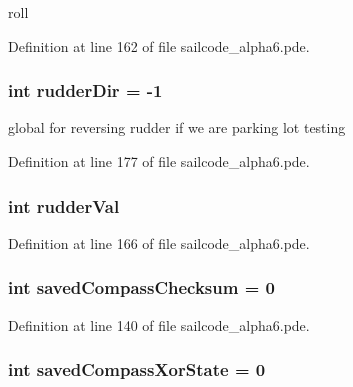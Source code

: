 roll 



\-Definition at line 162 of file sailcode\-\_\-alpha6.\-pde.

\hypertarget{group__group1_gaf79de3204853b3b4101113683e74cd54}{
\subsubsection[{rudder\-Dir}]{\setlength{\rightskip}{0pt plus 5cm}int {\bf rudder\-Dir} = -\/1}}
\label{group__group1_gaf79de3204853b3b4101113683e74cd54}


global for reversing rudder if we are parking lot testing 



\-Definition at line 177 of file sailcode\-\_\-alpha6.\-pde.

\hypertarget{group__group1_ga8b212bdc5d94214c0e3803a696f2f676}{
\subsubsection[{rudder\-Val}]{\setlength{\rightskip}{0pt plus 5cm}int {\bf rudder\-Val}}}
\label{group__group1_ga8b212bdc5d94214c0e3803a696f2f676}


\-Definition at line 166 of file sailcode\-\_\-alpha6.\-pde.

\hypertarget{group__group1_ga6e28e651127135816788318d7b473dc8}{
\subsubsection[{saved\-Compass\-Checksum}]{\setlength{\rightskip}{0pt plus 5cm}int {\bf saved\-Compass\-Checksum} = 0}}
\label{group__group1_ga6e28e651127135816788318d7b473dc8}


\-Definition at line 140 of file sailcode\-\_\-alpha6.\-pde.

\hypertarget{group__group1_ga766482b676879097212dc7aba1450aa0}{
\subsubsection[{saved\-Compass\-Xor\-State}]{\setlength{\rightskip}{0pt plus 5cm}int {\bf saved\-Compass\-Xor\-State} = 0}}
\label{group__group1_ga766482b676879097212dc7aba1450aa0}


